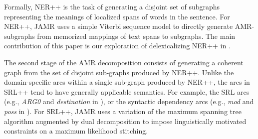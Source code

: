 \documentclass[11pt]{article}
\newcommand\e[1]{\textit{#1}} %
\begin{document}
Formally, NER++ is the task of generating a disjoint set of subgraphs representing the meanings of localized spans of words in the sentence.
For NER++, JAMR uses a simple Viterbi sequence model to directly generate AMR-subgraphs from memorized mappings of text spans to subgraphs. The main contribution of this paper is our exploration of delexicalizing NER++ in .


The second stage of the AMR decomposition consists of generating a coherent graph
  from the set of disjoint sub-graphs produced by NER++.
Unlike the domain-specific arcs within a single sub-graph produced by NER++, the
  arcs in SRL++ tend to have generally applicable semantics.
For example, the SRL arcs (e.g., \e{ARG0} and \e{destination} in ),
  or the syntactic dependency arcs (e.g., \e{mod} and \e{poss} in ).
For SRL++, JAMR uses a variation of the maximum spanning tree algorithm augmented by dual decomposition to impose linguistically motivated constraints on a maximum likelihood stitching. 
\end{document}
